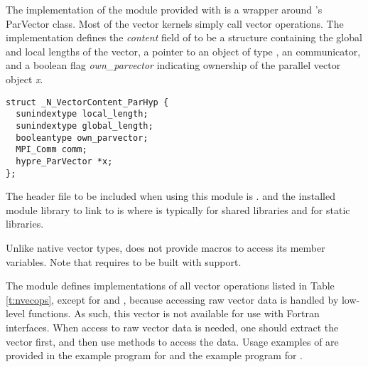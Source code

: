 %
The {\nvecph} implementation of the {\nvector} module provided with
{\sundials} is a wrapper around {\hypre}'s ParVector class. 
Most of the vector kernels simply call {\hypre} vector operations. 
The implementation defines the {\em content} field of  to 
be a structure containing the global and local lengths of the vector, a 
pointer to an object of type , an {\mpi} communicator, 
and a boolean flag {\em own\_parvector} indicating ownership of the
{\hypre} parallel vector object {\em x}.
\begin{verbatim}
struct _N_VectorContent_ParHyp {
  sunindextype local_length;
  sunindextype global_length;
  booleantype own_parvector;
  MPI_Comm comm;
  hypre_ParVector *x;
};
\end{verbatim}
The header file to be included when using this module is .
and the installed module library to link to is
where  is typically  for shared libraries and 
for static libraries.

Unlike native {\sundials} vector types, {\nvecph} does not provide macros 
to access its member variables.
Note that {\nvecph} requires {\sundials} to be built with {\mpi} support.

The {\nvecph} module defines implementations of all vector operations 
listed in Table \ref{t:nvecops}, except for  and 
, because accessing raw vector data is handled by 
low-level {\hypre} functions. 
As such, this vector is not available for use with {\sundials} Fortran interfaces.
When access to raw vector data is needed, one 
should extract the {\hypre} vector first, and then use {\hypre} 
methods to access the data. Usage examples of {\nvecph} are provided in 
the  example program for {\cvode} \cite{cvode_ex} 
and the  example program for {\arkode} \cite{arkode_ex}.

